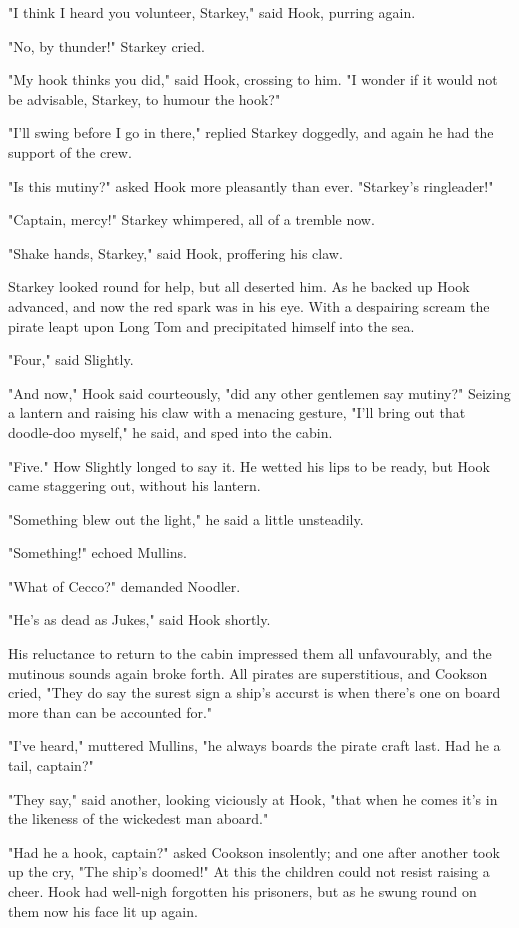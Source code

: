 "I think I heard you volunteer, Starkey," said Hook, purring again.


"No, by thunder!" Starkey cried.


"My hook thinks you did," said Hook, crossing to him. "I wonder if it
would not be advisable, Starkey, to humour the hook?"


"I'll swing before I go in there," replied Starkey doggedly, and again he
had the support of the crew.


"Is this mutiny?" asked Hook more pleasantly than ever. "Starkey's
ringleader!"


"Captain, mercy!" Starkey whimpered, all of a tremble now.


"Shake hands, Starkey," said Hook, proffering his claw.


Starkey looked round for help, but all deserted him. As he backed up Hook
advanced, and now the red spark was in his eye. With a despairing scream
the pirate leapt upon Long Tom and precipitated himself into the sea.


"Four," said Slightly.


"And now," Hook said courteously, "did any other gentlemen say mutiny?"
Seizing a lantern and raising his claw with a menacing gesture, "I'll
bring out that doodle-doo myself," he said, and sped into the cabin.


"Five." How Slightly longed to say it. He wetted his lips to be ready, but
Hook came staggering out, without his lantern.


"Something blew out the light," he said a little unsteadily.


"Something!" echoed Mullins.


"What of Cecco?" demanded Noodler.


"He's as dead as Jukes," said Hook shortly.


His reluctance to return to the cabin impressed them all unfavourably, and
the mutinous sounds again broke forth. All pirates are superstitious, and
Cookson cried, "They do say the surest sign a ship's accurst is when
there's one on board more than can be accounted for."


"I've heard," muttered Mullins, "he always boards the pirate craft last.
Had he a tail, captain?"


"They say," said another, looking viciously at Hook, "that when he comes
it's in the likeness of the wickedest man aboard."


"Had he a hook, captain?" asked Cookson insolently; and one after another
took up the cry, "The ship's doomed!" At this the children could not
resist raising a cheer. Hook had well-nigh forgotten his prisoners, but as
he swung round on them now his face lit up again.


